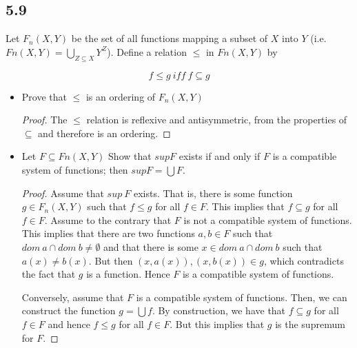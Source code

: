 \subsection*{5.9} Let $F_n(X,Y)$ be the set of all functions mapping a subset of $X$ into $Y$ (i.e. $Fn(X,Y) = \bigcup_{Z \subseteq X} Y^Z$). Define a relation $\leq$ in $Fn(X,Y)$ by

$$ f \leq g~iff~f \subseteq g $$

\begin{itemize}
    \item Prove that $\leq$ is an ordering of $F_n(X,Y)$
    \begin{proof}
    
    The $\leq$ relation is reflexive and antisymmetric, from the properties of $\subseteq$ and therefore is an ordering.
    
    \end{proof}
    
    \item Let $F \subseteq Fn(X,Y)$ Show that $sup F$ exists if and only if $F$ is a compatible system of functions; then $sup F = \bigcup F$.
    
    \begin{proof}
    
    Assume that $sup~F$ exists. That is, there is some function $g \in F_n(X,Y)$ such that $f \leq g$ for all $f \in F$. This implies that $f \subseteq g$ for all $f \in F$. Assume to the contrary that $F$ is not a compatible system of functions. This implies that there are two functions $a,b \in F$ such that $dom ~a \cap dom~b \neq \emptyset$ and that there is some $x \in dom~a \cap dom~b$ such that $a(x) \neq b(x)$. But then $(x, a(x)), (x, b(x)) \in g$, which contradicts the fact that $g$ is a function. Hence $F$ is a compatible system of functions.
    
    Conversely, assume that $F$ is a compatible system of functions. Then, we can construct the function $g = \bigcup f$. By construction, we have that $f \subseteq g$ for all $f \in F$ and hence $f \leq g$ for all $f \in F$. But this implies that $g$ is the supremum for $F$.
    
    \end{proof}
    
\end{itemize}

